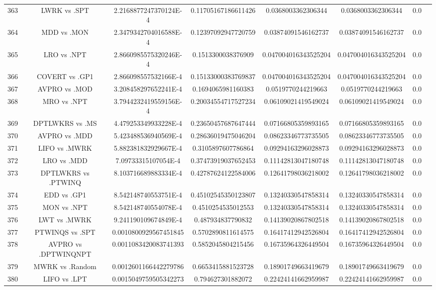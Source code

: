 \documentclass[a3paper,10pt]{article}
\begin{document}
\begin{table}[!htp]
\begin{tabular}{cccccccc}
363&LWRK vs .SPT&2.2168877247370124E-4&0.11705167186611426&0.0368003362306344&0.0368003362306344&0.0\\
364&MDD vs .MON&2.3479342704016588E-4&0.12397092947720759&0.03874091546162737&0.03874091546162737&0.0\\
365&LRO vs .NPT&2.8660985575320246E-4&0.1513300038376909&0.047004016343525204&0.047004016343525204&0.0\\
366&COVERT vs .GP1&2.866098557532166E-4&0.15133000383769837&0.047004016343525204&0.047004016343525204&0.0\\
367&AVPRO vs .MOD&3.208458297652241E-4&0.1694065981160383&0.0519770244219663&0.0519770244219663&0.0\\
368&MRO vs .NPT&3.7944232419559156E-4&0.20034554717527234&0.06109021419549024&0.06109021419549024&0.0\\
369&DPTLWKRS vs .MS&4.479253349933228E-4&0.23650457687647444&0.07166805359893165&0.07166805359893165&0.0\\
370&AVPRO vs .MDD&5.423488536940569E-4&0.28636019475046204&0.08623346773735505&0.08623346773735505&0.0\\
371&LIFO vs .MWRK&5.882381832929667E-4&0.3105897607786864&0.09294163296028873&0.09294163296028873&0.0\\
372&LRO vs .MDD&7.09733315107054E-4&0.37473919037652453&0.11142813047180748&0.11142813047180748&0.0\\
373&DPTLWKRS vs .PTWINQ&8.103716689883334E-4&0.42787624122584006&0.12641798036218002&0.12641798036218002&0.0\\
374&EDD vs .GP1&8.542148740553751E-4&0.45102545350123807&0.13240330547858314&0.13240330547858314&0.0\\
375&MON vs .NPT&8.542148740554078E-4&0.4510254535012553&0.13240330547858314&0.13240330547858314&0.0\\
376&LWT vs .MWRK&9.241190109674849E-4&0.487934837790832&0.14139020867802518&0.14139020867802518&0.0\\
377&PTWINQS vs .SPT&0.0010800929567451845&0.5702890811614575&0.16417412942526804&0.16417412942526804&0.0\\
378&AVPRO vs .DPTWINQNPT&0.0011083420083741393&0.5852045804215456&0.16735964326449504&0.16735964326449504&0.0\\
379&MWRK vs .Random&0.0012601166442279786&0.6653415881523728&0.18901749663419679&0.18901749663419679&0.0\\
380&LIFO vs .LPT&0.0015049759505342273&0.794627301882072&0.22424141662959987&0.22424141662959987&0.0\\

\end{tabular}
\end{table}
\end{document}
